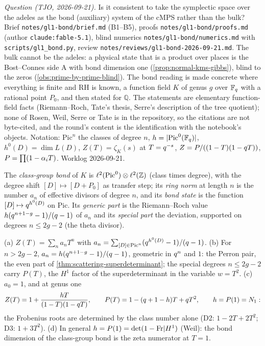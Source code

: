 \emph{Question (TJO, 2026-09-21).} Is it consistent to take the symplectic space over the adeles as the bond
(auxiliary) system of the cMPS rather than the bulk? Brief \texttt{notes/gl1-bond/brief.md} (B1--B5), proofs
\texttt{notes/gl1-bond/proofs.md} (author \texttt{claude:fable-5.1}), blind numerics
\texttt{notes/gl1-bond/numerics.md} with \texttt{scripts/gl1\_bond.py}, review
\texttt{notes/reviews/gl1-bond-2026-09-21.md}. The bulk cannot be the adeles: a physical state that is a product
over places is the Bost--Connes side A with bond dimension one (\cref{prop:normal-kms-gibbs}), blind to the zeros
(\cref{obs:prime-by-prime-blind}). The bond reading is made concrete where everything is finite and RH is known,
a function field $K$ of genus $g$ over $\mathbb F_q$ with a rational point $P_0$, and then stated for $\mathbb Q$. The
statements are elementary function-field facts (Riemann--Roch, Tate's thesis, Serre's description of the tree
quotient); none of Rosen, Weil, Serre or Tate is in the repository, so the citations are not byte-cited, and the
round's content is the identification with the notebook's objects. Notation: $\mathrm{Pic}^n$ the classes of
degree $n$, $h = |\mathrm{Pic}^0(\mathbb F_q)|$, $h^0(D) = \dim L(D)$, $Z(T) = \zeta_K(s)$ at $T = q^{-s}$,
$Z = P/((1-T)(1-q T))$, $P = \prod(1-\alpha_{i}T)$. Worklog 2026-09-21.

\begin{definition}
\label{def:class-group-bond}
The \emph{class-group bond} of $K$ is $\ell^2(\mathrm{Pic}^0)\otimes\ell^2(\mathbb Z)$ (class times degree), with the
degree shift $[D]\mapsto[D+P_0]$ as transfer step; its \emph{ring norm} at length $n$ is the number $a_n$ of
effective divisors of degree $n$, and its \emph{bond state} is the function $[D]\mapsto q^{h^0(D)}$ on
$\mathrm{Pic}$. Its \emph{generic part} is the Riemann--Roch value $h(q^{n+1-g}-1)/(q-1)$ of $a_n$ and its
\emph{special part} the deviation, supported on degrees $n\le2g-2$ (the theta divisor).
\end{definition}

\begin{proposition}
\label{prop:class-group-bond}
(a) $Z(T) = \sum_na_nT^n$ with $a_n = \sum_{[D]\in\mathrm{Pic}^n}(q^{h^0(D)}-1)/(q-1)$. (b) For $n>2g-2$,
$a_n = h(q^{n+1-g}-1)/(q-1)$, geometric in $q^n$ and $1$: the Perron pair, the even part of
\cref{thm:scattering-superdeterminant}; the special degrees $n\le2g-2$ carry $P(T)$, the $H^1$ factor of the
superdeterminant in the variable $w = T^2$. (c) $a_0 = 1$, and at genus one
\[
Z(T) = 1+\frac{hT}{(1-T)(1-q T)},\qquad P(T) = 1-(q+1-h)T+q T^2,\qquad h = P(1) = N_{1}:
\]
the Frobenius roots are determined by the class number alone (D2: $1-2T+2T^2$; D3: $1+3T^2$). (d) In general
$h = P(1) = \det(1-\mathrm{Fr}|H^1)$ (Weil): the bond dimension of the class-group bond is the zeta numerator at $T = 1$.
\end{proposition}

